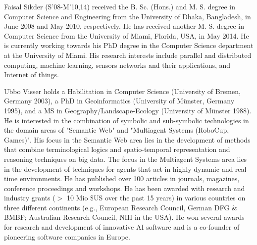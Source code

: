 \documentclass[]{IEEEtran}
\begin{document}
\begin{IEEEbiography}
{Faisal Sikder} 
 (S'08-M'10,14) received the B. Sc. (Hons.) and M. S. degree in Computer Science
and Engineering from the University of Dhaka, Bangladesh, in June 2008 and May
2010, respectively. He has received another M. S. degree
in Computer Science from the University of Miami, Florida, USA, in May 2014. He
is currently working towards his PhD degree in the Computer Science department
at the University of Miami. His research interests include parallel and 
distributed computing, machine learning, sensors networks and their
applications, and Internet of things.  
\end{IEEEbiography}
\begin{IEEEbiography}
{Ubbo Visser} holds a Habilitation in Computer Science (University of Bremen,
Germany 2003), a PhD in Geoinformatics (University of M{\"u}nster, Germany
1995), and a MS in Geography/Landscape-Ecology (University of M{\"u}nster 1988).
He is interested in the combination of symbolic and sub-symbolic technologies in
the domain areas of "Semantic Web" and "Multiagent Systems (RoboCup, Games)".
His focus in the Semantic Web area lies in the development of methods that
combine terminological logics and spatio-temporal representation and reasoning
techniques on big data. The focus in the Multiagent Systems area lies in the
development of techniques for agents that act in highly dynamic and real-time
environments.  He has published over 100 articles in journals, magazines,
conference proceedings and workshops. He has been awarded with research and
industry grants ($>$ 10 Mio \$US over the past 15 years) in various countries on
three different continents (e.g., European Research Council, German DFG \& BMBF;
Australian Research Council, NIH in the USA). He won several awards for research
and development of innovative AI software and is a co-founder of pioneering
software companies in Europe.
\end{IEEEbiography}

\vfill
\end{document}
